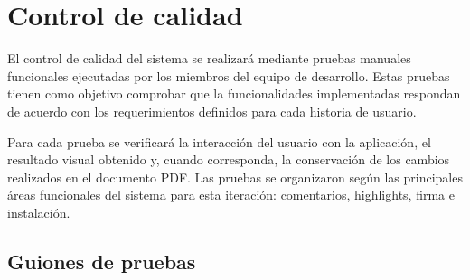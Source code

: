 \chapter{Control de calidad}
El control de calidad del sistema se realizará mediante pruebas manuales funcionales ejecutadas por los miembros del equipo de desarrollo. Estas pruebas tienen como objetivo comprobar que la funcionalidades implementadas respondan de acuerdo con los requerimientos definidos para cada historia de usuario.

Para cada prueba se verificará la interacción del usuario con la aplicación, el resultado visual obtenido y, cuando corresponda, la conservación de los cambios realizados en el documento PDF. Las pruebas se organizaron según las principales áreas funcionales del sistema para esta iteración: comentarios, highlights, firma e instalación.

\section{Guiones de pruebas}

